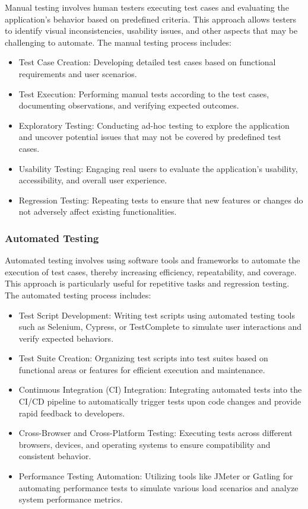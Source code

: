 		Manual testing involves human testers executing test cases and evaluating the application's behavior based on predefined criteria. This approach allows testers to identify visual inconsistencies, usability issues, and other aspects that may be challenging to automate. The manual testing process includes:
		
		\begin{itemize}
			\item Test Case Creation: Developing detailed test cases based on functional requirements and user scenarios.
			\item Test Execution: Performing manual tests according to the test cases, documenting observations, and verifying expected outcomes.
			\item Exploratory Testing: Conducting ad-hoc testing to explore the application and uncover potential issues that may not be covered by predefined test cases.
			\item Usability Testing: Engaging real users to evaluate the application's usability, accessibility, and overall user experience.
			\item Regression Testing: Repeating tests to ensure that new features or changes do not adversely affect existing functionalities.
		\end{itemize}
		
		\subsubsection{Automated Testing}
		
		Automated testing involves using software tools and frameworks to automate the execution of test cases, thereby increasing efficiency, repeatability, and coverage. This approach is particularly useful for repetitive tasks and regression testing. The automated testing process includes:
		
		\begin{itemize}
			\item Test Script Development: Writing test scripts using automated testing tools such as Selenium, Cypress, or TestComplete to simulate user interactions and verify expected behaviors.
			\item Test Suite Creation: Organizing test scripts into test suites based on functional areas or features for efficient execution and maintenance.
			\item Continuous Integration (CI) Integration: Integrating automated tests into the CI/CD pipeline to automatically trigger tests upon code changes and provide rapid feedback to developers.
			\item Cross-Browser and Cross-Platform Testing: Executing tests across different browsers, devices, and operating systems to ensure compatibility and consistent behavior.
			\item Performance Testing Automation: Utilizing tools like JMeter or Gatling for automating performance tests to simulate various load scenarios and analyze system performance metrics.
		\end{itemize}
		
